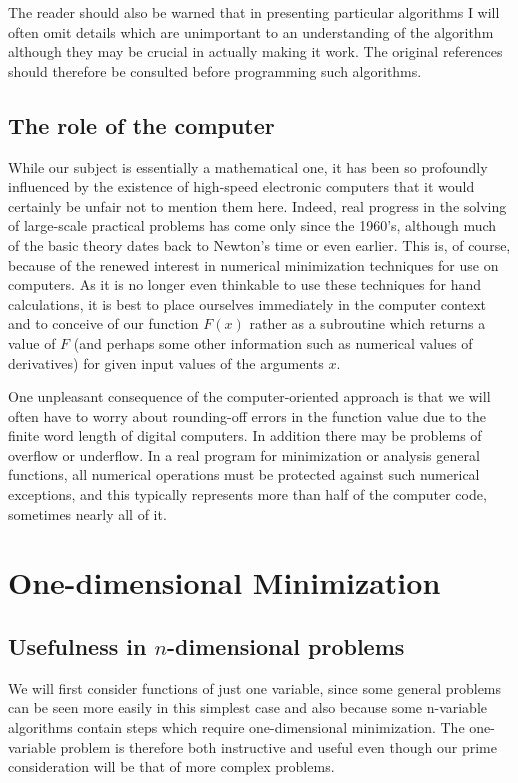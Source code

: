      The reader should also be warned that in presenting particular
algorithms I will often omit details which are unimportant to an
understanding of the algorithm although they may be crucial in actually
making it work.  The original references should therefore be consulted
before programming such algorithms.
 
 
\section{The role of the computer}
 
     While our subject is essentially a mathematical one, it has been so
profoundly influenced by the existence of high-speed electronic computers
that it would certainly be unfair  not to mention them here.  Indeed,
real progress in the solving of large-scale practical problems has come
only since the 1960's, although much of the basic theory dates
back to Newton's time or even earlier.  This is, of course, because of
the renewed interest in numerical minimization techniques for use on
computers.  As it is no longer even thinkable to use these techniques
for hand calculations, it is best to place ourselves immediately in the
computer context and to conceive of our function $F(x)$ rather as a
subroutine which returns a value of $F$
(and perhaps some other information
such as numerical values of derivatives) for given input values of the
arguments $x$.
 
     One unpleasant consequence of the computer-oriented approach is that
we will often have to worry about rounding-off errors in the
function value due to the finite word length of digital
computers.  
In addition there may be problems of overflow or underflow. In a real program for minimization or
analysis general functions, all numerical operations must be protected against such numerical
exceptions, and this typically represents more than half of the computer code, sometimes nearly
all of it.
 
 
\chapter{One-dimensional Minimization}
 
\section{Usefulness in $n$-dimensional problems}
     We will first consider functions of just one variable, since some
general problems can be seen more easily in this simplest case and also
because some n-variable algorithms contain steps which require
one-dimensional minimization.  The one-variable problem is therefore both
instructive and useful even though our prime consideration will be that
of more complex problems.
 
